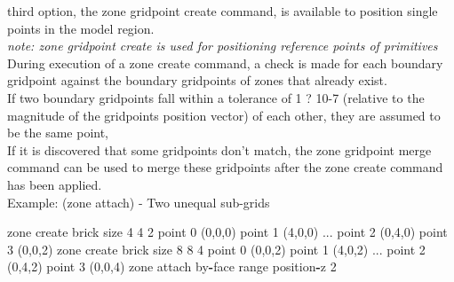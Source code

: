 \documentclass[a4paper, nobind]{templates/ociamthesis}
\newenvironment{Shaded}{\begin{snugshade}}{\end{snugshade}}
\newcommand{\BuiltInTok}[1]{#1}
\newcommand{\DecValTok}[1]{\textcolor[rgb]{0.00,0.00,0.81}{#1}}
\newcommand{\NormalTok}[1]{#1}
\newcommand{\OperatorTok}[1]{\textcolor[rgb]{0.81,0.36,0.00}{\textbf{#1}}}
\renewenvironment{Shaded}
{
  \vspace{10pt}%
  \begin{snugshade}%
}{%
  \end{snugshade}%
  \vspace{8pt}%
}
\begin{document}
third option, the zone gridpoint create command, is available to position single points in the model region.\\
\emph{note: zone gridpoint create is used for positioning reference points of primitives }\\

During execution of a zone create command, a check is made for each boundary gridpoint against the boundary gridpoints of zones that already exist.\\
If two boundary gridpoints fall within a tolerance of 1 ? 10-7 (relative to the magnitude of the gridpoints position vector) of each other, they are assumed to be the same point,\\
If it is discovered that some gridpoints don't match, the zone gridpoint merge command can be used to merge these gridpoints after the zone create command has been applied.\\

Example: (zone attach) - Two unequal sub-grids

\begin{Shaded}
\begin{Highlighting}[]
\NormalTok{zone create brick size }\DecValTok{4} \DecValTok{4} \DecValTok{2}\NormalTok{ point }\DecValTok{0}\NormalTok{ (}\DecValTok{0}\NormalTok{,}\DecValTok{0}\NormalTok{,}\DecValTok{0}\NormalTok{) point }\DecValTok{1}\NormalTok{ (}\DecValTok{4}\NormalTok{,}\DecValTok{0}\NormalTok{,}\DecValTok{0}\NormalTok{) ...}
\NormalTok{                             point }\DecValTok{2}\NormalTok{ (}\DecValTok{0}\NormalTok{,}\DecValTok{4}\NormalTok{,}\DecValTok{0}\NormalTok{) point }\DecValTok{3}\NormalTok{ (}\DecValTok{0}\NormalTok{,}\DecValTok{0}\NormalTok{,}\DecValTok{2}\NormalTok{)}
\NormalTok{zone create brick size }\DecValTok{8} \DecValTok{8} \DecValTok{4}\NormalTok{ point }\DecValTok{0}\NormalTok{ (}\DecValTok{0}\NormalTok{,}\DecValTok{0}\NormalTok{,}\DecValTok{2}\NormalTok{) point }\DecValTok{1}\NormalTok{ (}\DecValTok{4}\NormalTok{,}\DecValTok{0}\NormalTok{,}\DecValTok{2}\NormalTok{) ...}
\NormalTok{                             point }\DecValTok{2}\NormalTok{ (}\DecValTok{0}\NormalTok{,}\DecValTok{4}\NormalTok{,}\DecValTok{2}\NormalTok{) point }\DecValTok{3}\NormalTok{ (}\DecValTok{0}\NormalTok{,}\DecValTok{0}\NormalTok{,}\DecValTok{4}\NormalTok{)}
\NormalTok{zone attach by}\OperatorTok{{-}}\NormalTok{face }\BuiltInTok{range}\NormalTok{ position}\OperatorTok{{-}}\NormalTok{z }\DecValTok{2}
\end{Highlighting}
\end{Shaded}
\end{document}
